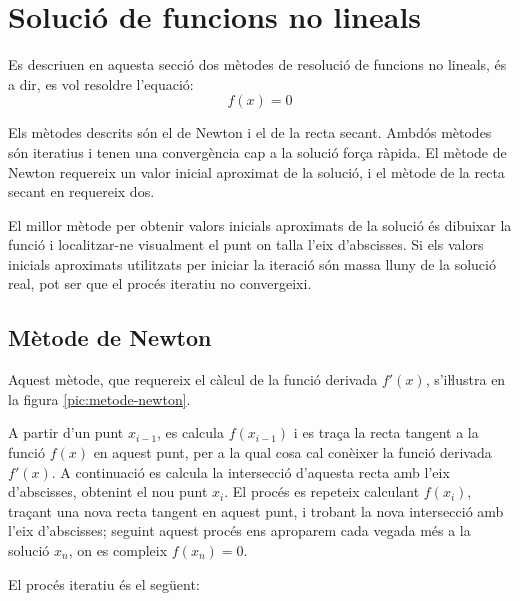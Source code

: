 \section{Solució de funcions no lineals}\label{sec:func-no-lin}

Es descriuen en aquesta secció dos mètodes de resolució de funcions no lineals, és a dir, es vol resoldre l'equació: \begin{equation}
   f(x) = 0 \end{equation}

Els mètodes descrits són el de Newton i el de la recta secant. Ambdós mètodes són iteratius i tenen una convergència cap a la solució força ràpida. El mètode de Newton requereix un valor inicial aproximat de la solució, i el mètode de la recta secant en requereix dos.

El millor mètode per obtenir valors inicials aproximats de la solució és dibuixar la funció i localitzar-ne visualment el punt on talla l'eix d'abscisses. Si els valors inicials aproximats utilitzats per iniciar la iteració són massa lluny de la solució real, pot ser que el procés iteratiu no convergeixi.


\subsection{Mètode de Newton}

Aquest mètode, que requereix el càlcul de la funció derivada $f'(x)$, s'iŀlustra en la figura \vref{pic:metode-newton}.

A partir d'un punt $x_{i-1}$, es calcula $f(x_{i-1})$ i es traça la recta tangent a la funció $f(x)$ en aquest punt, per a la qual cosa cal conèixer la funció derivada $f'(x)$. A continuació es calcula la intersecció d'aquesta recta amb l'eix d'abscisses, obtenint el nou punt $x_i$. El procés es repeteix calculant $f(x_i)$, traçant una nova recta tangent en aquest punt, i trobant la nova intersecció amb l'eix d'abscisses; seguint aquest procés ens aproparem cada vegada més a la solució $x_n$, on es compleix $f(x_n)=0$.

\begin{center}
    
    \label{pic:metode-newton}
\end{center}

El procés iteratiu és el següent:

